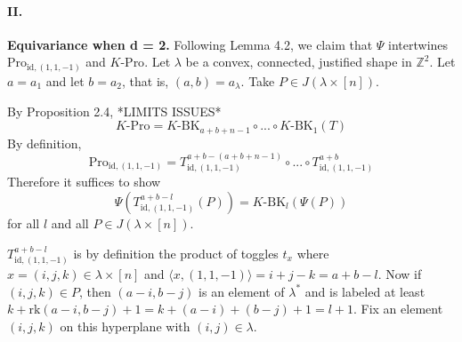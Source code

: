 \documentclass[10pt,letter]{article}
\begin{document}
\paragraph*{II.} \textbf{Equivariance when d = 2.} Following Lemma 4.2, we claim that $\Psi$ intertwines $\text{Pro}_{\text{id},(1,1,-1)}$ and $K$-$\text{Pro}$. Let $\lambda$ be a convex, connected, justified shape in $\mathbb{Z}^2$. Let $a = a_1$ and let $b = a_2$, that is, $(a,b) = a_{\lambda}$.  Take $P \in J(\lambda \times [n])$. 

By Proposition 2.4,  *LIMITS ISSUES*
\begin{equation*}
K\text{-}\text{Pro} = K\text{-}\text{BK}_{a+b+n-1} \circ  ... \circ K\text{-}\text{BK}_1(T)
\end{equation*}
By definition, 
\begin{equation*}
\text{Pro}_{\text{id},(1,1,-1)} = T^{a+b-(a+b+n-1)}_{\text{id},(1,1,-1)} \circ ... \circ T^{a+b}_{\text{id},(1,1,-1)}
\end{equation*}
Therefore it suffices to show 
\begin{equation*}
\Psi(T^{a+b-l}_{\text{id},(1,1,-1)}(P)) = K\text{-}\text{BK}_l(\Psi(P))
\end{equation*}
for all $l$ and all $P \in J(\lambda \times [n])$. 

$T^{a+b-l}_{\text{id},(1,1,-1)}$ is by definition the product of toggles $t_x$ where $x = (i,j,k) \in \lambda \times [n]$ and $\langle x,(1,1,-1) \rangle = i + j - k = a+b - l$. Now if $(i,j,k) \in P$, then $(a-i,b-j)$ is an element of $\lambda^{\ast}$ and is labeled at least $k + \text{rk}(a-i,b-j) + 1= k + (a-i) + (b-j) + 1 = l + 1$. Fix an element $(i,j,k)$ on this hyperplane with $(i,j) \in \lambda$.
\end{document}
